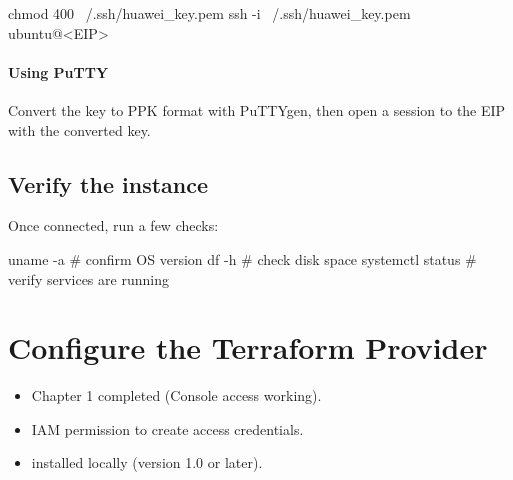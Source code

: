 \documentclass[english]{guide}
\begin{document}
\begin{codigo}[bash]
chmod 400 ~/.ssh/huawei_key.pem
ssh -i ~/.ssh/huawei_key.pem ubuntu@<EIP>
\end{codigo}

\paragraph{Using PuTTY}
Convert the key to PPK format with PuTTYgen, then open a session to the
EIP with the converted key.

\subsection{Verify the instance}

Once connected, run a few checks:

\begin{codigo}[bash]
uname -a          # confirm OS version
df -h             # check disk space
systemctl status  # verify services are running
\end{codigo}


\section{Configure the Terraform Provider}

\begin{objetivos}

  \prerequisitos
  \begin{itemize}
    \item Chapter 1 completed (Console access working).
    \item IAM permission to create access credentials.
    \item {} installed locally (version 1.0 or later).
  \end{itemize}
\end{objetivos}
\end{document}
